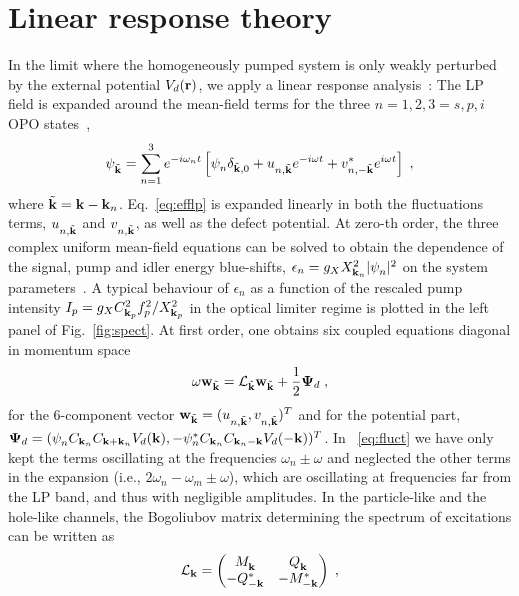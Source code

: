 \section{Linear response theory}
%
In the limit where the homogeneously pumped system is only weakly
perturbed by the external potential $V_d(\mathbf{r})$, we apply a linear
response analysis~\cite{Astrakharchik_2004}: The LP field is expanded
around the mean-field terms for the three $n=1,2,3=s,p,i$ OPO
states~\cite{Whittaker_2005},
%
\begin{equation}
  \psi_{\tilde{\mathbf{k}}}^{} = \sum_{n=1}^3 e^{-i \omega_n t}
  \left[\psi_{n}^{} \delta_{\tilde{\mathbf{k}},0} +
    u_{n,\tilde{\mathbf{k}}}^{} e^{-i\omega t} +
    v^*_{n,-\tilde{\mathbf{k}}} e^{i\omega t} \right]\; ,
\label{eq:expan}
\end{equation}
%
where $\tilde{\mathbf{k}} = \mathbf{k} - \mathbf{k}_n$. Eq.~\eqref{eq:efflp}
is expanded linearly in both the fluctuations terms,
$u_{n,\tilde{\mathbf{k}}}^{}$ and $v_{n,\tilde{\mathbf{k}}}^{}$, as well
as the defect potential.  At zero-th order, the three complex uniform
mean-field equations can be solved to obtain the dependence of the
signal, pump and idler energy blue-shifts, $\epsilon_n = g_X
X^2_{\mathbf{k}_n} |\psi_{n}^{}|^2$ on the system
parameters~\cite{Wouters_2007_b,SM}. A typical behaviour of
$\epsilon_n$ as a function of the rescaled pump intensity $I_p = g_X
C_{\mathbf{k}_p}^2 f_p^2/X_{\mathbf{k}_p}^2$ in the optical limiter regime
is plotted in the left panel of Fig.~\ref{fig:spect}.
%
At first order, one obtains six coupled equations diagonal in momentum
space~\cite{Wouters_2007}
%
\begin{equation}
  \omega \mathbf{w}_{\tilde{\mathbf{k}}} = \mathcal{L}_{\tilde{\mathbf{k}}}
  \mathbf{w}_{\tilde{\mathbf{k}}} + \frac{1}{2} \bm{\Psi}_d\; ,
\label{eq:fluct}
\end{equation}
%
for the $6$-component vector $\mathbf{w}_{\tilde{\mathbf{k}}} =
(u_{n,\tilde{\mathbf{k}}}^{} , v_{n,\tilde{\mathbf{k}}}^{})^{T}$ and for
the potential part, $\bm{\Psi}_d = (\psi_n^{} C_{\mathbf{k}_n}
C_{\mathbf{k} + \mathbf{k}_n} V_d(\mathbf{k}),-\psi_n^* C_{\mathbf{k}_n}
C_{\mathbf{k}_n - \mathbf{k}} V_d(-\mathbf{k}))^{T}$. In ~\eqref{eq:fluct}
we have only kept the terms oscillating at the frequencies $\omega_n
\pm \omega$ and neglected the other terms in the expansion (i.e.,
$2\omega_n - \omega_m \pm \omega$), which are oscillating at
frequencies far from the LP band, and thus with negligible amplitudes.
%
In the particle-like and the hole-like channels, the Bogoliubov matrix
determining the spectrum of excitations can be written
as~\cite{Wouters_2007}
%
\begin{equation}
  \mathcal{L}_{\mathbf{k}} = \begin{pmatrix} M_{\mathbf{k}}^{} & Q_{\mathbf{k}}^{}
    \\ -Q_{-\mathbf{k}}^* & -M_{-\mathbf{k}}^* \end{pmatrix} \; ,
\end{equation}
